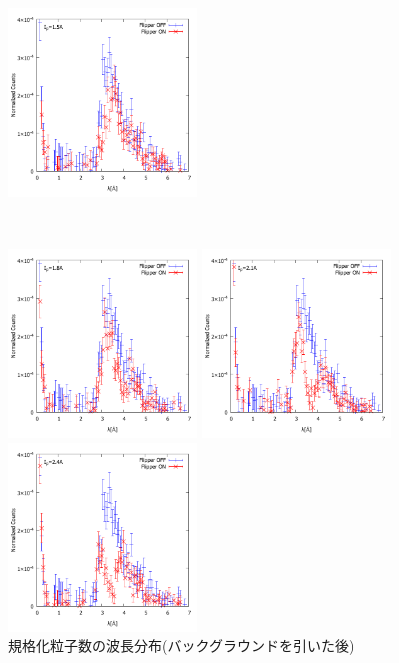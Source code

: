 \begin{figure}[h]
\begin{minipage}{0.33\hsize}
\end{minipage}
\begin{minipage}{0.33\hsize}
\includegraphics[width=5cm]{discussion/NC-BG/NormalizedCounts_b_15A.pdf}
\end{minipage}\\
\begin{minipage}{0.33\hsize}
\includegraphics[width=5cm]{discussion/NC-BG/NormalizedCounts_b_18A.pdf}
\end{minipage}
\begin{minipage}{0.33\hsize}
\includegraphics[width=5cm]{discussion/NC-BG/NormalizedCounts_b_21A.pdf}
\end{minipage}
\begin{minipage}{0.33\hsize}
\includegraphics[width=5cm]{discussion/NC-BG/NormalizedCounts_b_24A.pdf}
\end{minipage}
\caption{規格化粒子数の波長分布(バックグラウンドを引いた後)}\label{Discussion2_fig_NC_b}
\end{figure}

